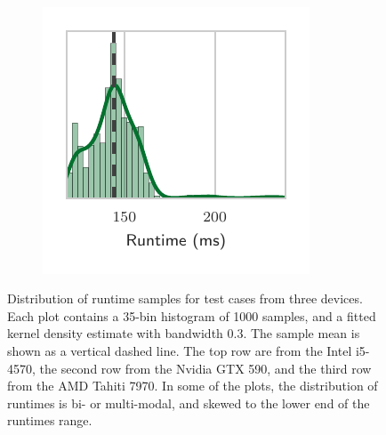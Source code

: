 \documentclass[nonatbib,preprint,nocopyrightspace,9pt]{sigplanconf}
\begin{document}
\begin{figure}
\begin{subfigure}[h]{.32\columnwidth}
      \vspace{-1.5em} %
      \caption{}
      \label{fig:runtimes-histogram-8}
    \end{subfigure}
    ~%
    \begin{subfigure}[h]{.32\columnwidth}
      \centering
      \includegraphics[width=\textwidth]{img/runtimes_histogram_9}
      \vspace{-1.5em} %
      \caption{}
      \label{fig:runtimes-histogram-9}
    \end{subfigure}
    \caption[Distribution of stencil code runtimes]{%
    Distribution of runtime samples for test cases from three devices. Each plot
    contains a 35-bin histogram of 1000 samples, and a fitted kernel density
    estimate with bandwidth 0.3. The sample mean is shown as a vertical dashed
    line. The top row are from the Intel i5-4570, the second row from the Nvidia
    GTX 590, and the third row from the AMD Tahiti 7970. In some of the plots, the
    distribution of runtimes is bi- or multi-modal, and skewed to the lower end of
    the runtimes range.%
    }
    \label{fig:runtime-histograms}
  \end{figure}
\end{document}
